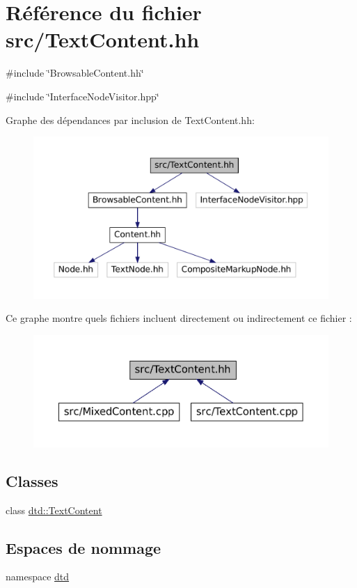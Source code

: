 \hypertarget{_text_content_8hh}{
\section{Référence du fichier src/TextContent.hh}
\label{_text_content_8hh}
}
{\ttfamily \#include \char`\"{}BrowsableContent.hh\char`\"{}}\par
{\ttfamily \#include \char`\"{}InterfaceNodeVisitor.hpp\char`\"{}}\par
Graphe des dépendances par inclusion de TextContent.hh:\nopagebreak
\begin{figure}[H]
\begin{center}
\leavevmode
\includegraphics[width=400pt]{_text_content_8hh__incl}
\end{center}
\end{figure}
Ce graphe montre quels fichiers incluent directement ou indirectement ce fichier :\nopagebreak
\begin{figure}[H]
\begin{center}
\leavevmode
\includegraphics[width=400pt]{_text_content_8hh__dep__incl}
\end{center}
\end{figure}
\subsection*{Classes}
\begin{DoxyCompactItemize}
\item 
class \hyperlink{classdtd_1_1_text_content}{dtd::TextContent}
\end{DoxyCompactItemize}
\subsection*{Espaces de nommage}
\begin{DoxyCompactItemize}
\item 
namespace \hyperlink{namespacedtd}{dtd}
\end{DoxyCompactItemize}
